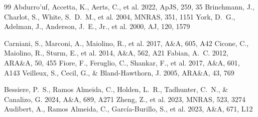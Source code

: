 \documentclass[twocolumn]{aastex702}
\begin{document}
\begin{thebibliography}{99}
 Abdurro'uf, Accetta, K., Aerts, C., et al. 2022, ApJS, 259, 35
 Brinchmann, J., Charlot, S., White, S.~D.~M., et al. 2004, MNRAS, 351, 1151
 York, D.~G., Adelman, J., Anderson, J.~E., Jr., et al. 2000, AJ, 120, 1579

 Carniani, S., Marconi, A., Maiolino, R., et al. 2017, A\&A, 605, A42
 Cicone, C., Maiolino, R., Sturm, E., et al. 2014, A\&A, 562, A21
 Fabian, A.~C. 2012, ARA\&A, 50, 455
 Fiore, F., Feruglio, C., Shankar, F., et al. 2017, A\&A, 601, A143
 Veilleux, S., Cecil, G., \& Bland-Hawthorn, J. 2005, ARA\&A, 43, 769

 Bessiere, P.~S., Ramos Almeida, C., Holden, L.~R., Tadhunter, C.~N., \& Canalizo, G. 2024, A\&A, 689, A271
 Zheng, Z., et al. 2023, MNRAS, 523, 3274
 Audibert, A., Ramos Almeida, C., García-Burillo, S., et al. 2023, A\&A, 671, L12
\end{thebibliography}
\end{document}
